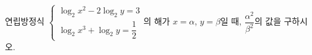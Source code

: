 연립방정식 $\begin{cases} \log_2 x^2-2\log_2 y=3 \\ \log_2 x^3+\log_2 y=\dfrac{1}{2} \end{cases}$의 해가 $x=\alpha$, $y=\beta$일 때, $\dfrac{\alpha^2}{\beta^2}$의 값을 구하시오.
